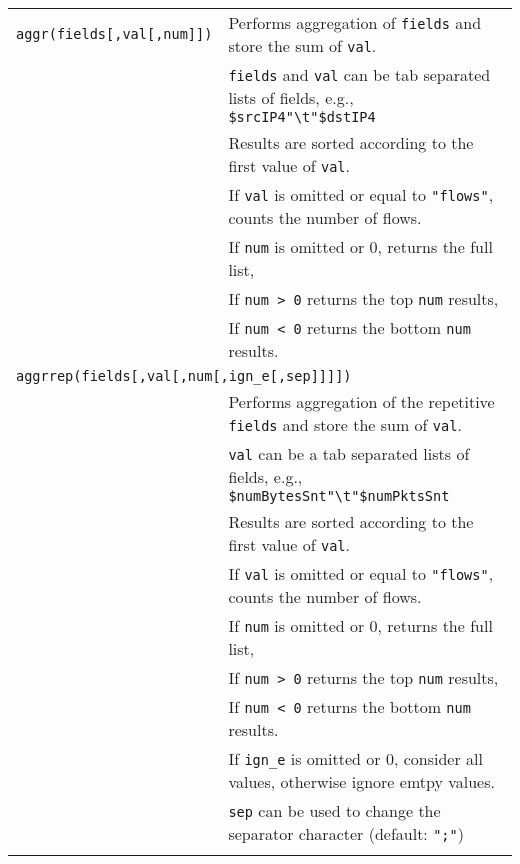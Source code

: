 \documentclass[documentation]{subfiles}
\begin{document}
\begin{longtable}{ll}
    {\tt aggr(fields[,val[,num]])} & Performs aggregation of {\tt fields} and store the sum of {\tt val}.\\
                             & {\tt fields} and {\tt val} can be tab separated lists of fields, e.g., {\tt \$srcIP4"\textbackslash{}t"\$dstIP4}\\
                             & Results are sorted according to the first value of {\tt val}.\\
                             & If {\tt val} is omitted or equal to {\tt "flows"}, counts the number of flows.\\
                             & If {\tt num} is omitted or 0, returns the full list,\\
                             & If {\tt num > 0} returns the top {\tt num} results,\\
                             & If {\tt num < 0} returns the bottom {\tt num} results.\\
    \multicolumn{2}{l}{\tt aggrrep(fields[,val[,num[,ign\_e[,sep]]]])}\\
                             & Performs aggregation of the repetitive {\tt fields} and store the sum of {\tt val}.\\
                             & {\tt val} can be a tab separated lists of fields, e.g., {\tt \$numBytesSnt"\textbackslash{}t"\$numPktsSnt}\\
                             & Results are sorted according to the first value of {\tt val}.\\
                             & If {\tt val} is omitted or equal to {\tt "flows"}, counts the number of flows.\\
                             & If {\tt num} is omitted or 0, returns the full list,\\
                             & If {\tt num > 0} returns the top {\tt num} results,\\
                             & If {\tt num < 0} returns the bottom {\tt num} results.\\
                             & If {\tt ign\_e} is omitted or 0, consider all values, otherwise ignore emtpy values.\\
                             & {\tt sep} can be used to change the separator character (default: {\tt ";"})\\\\



\end{longtable}
\end{document}
